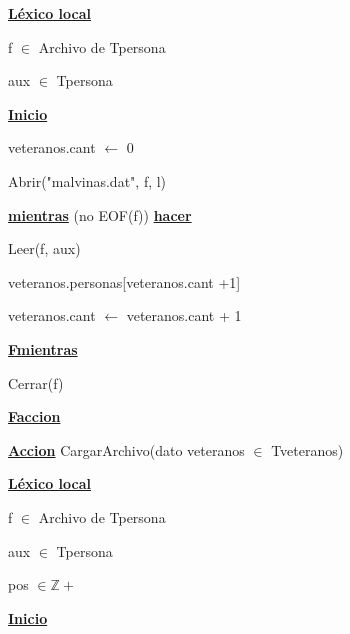 \documentclass{article}
\begin{document}
        \hspace{8mm}\underline{\textbf{Léxico local}}

            \hspace{12mm}f $\in$ Archivo de Tpersona

            \hspace{12mm}aux $\in$ Tpersona

        \hspace{8mm}\underline{\textbf{Inicio}}

            \hspace{12mm}veteranos.cant $\leftarrow$ 0

            \hspace{12mm}Abrir("malvinas.dat", f, l)

            \hspace{12mm}\underline{\textbf{mientras}} (no EOF(f)) \underline{\textbf{hacer}}

                \hspace{16mm}Leer(f, aux)

                \hspace{16mm}veteranos.personas[veteranos.cant +1]

                \hspace{16mm}veteranos.cant $\leftarrow$ veteranos.cant + 1

            \hspace{12mm}\underline{\textbf{Fmientras}}

            \hspace{12mm}Cerrar(f)

    \hspace{4mm}\underline{\textbf{Faccion}}

    \vspace{4mm}

    \hspace{4mm}\underline{\textbf{Accion}} CargarArchivo(dato veteranos $\in$ Tveteranos)

        \hspace{8mm}\underline{\textbf{Léxico local}}

            \hspace{12mm}f $\in$ Archivo de Tpersona

            \hspace{12mm}aux $\in$ Tpersona

            \hspace{12mm}pos $\in \mathbb{Z}+$

        \hspace{8mm}\underline{\textbf{Inicio}}
\end{document}
